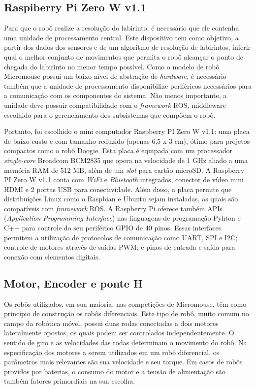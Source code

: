 \subsection{Raspiberry Pi Zero W v1.1}
\label{ssec:raspiberry_pi_zero}
Para que o robô realize a resolução do labirinto, é necessário que ele contenha uma unidade de processamento central. Este dispositivo tem como objetivo, a partir dos dados dos sensores e de um algoritmo de resolução de labirintos, inferir qual o melhor conjunto de movimentos que permita o robô alcançar o ponto de chegada do labirinto no menor tempo possível. Como o modelo de robô Micromouse possui um baixo nível de abstração de \textit{hardware}, é necessário também que a unidade de processamento disponibilize periféricos necessários para a comunicação com os componentes do sistema. Não menos importante, a unidade deve possuir compatibilidade com o \textit{framework} ROS, middleware escolhido para o gerenciamento dos subsistemas que compõem o robô.

Portanto, foi escolhido o mini computador Raspberry PI Zero W v1.1: uma placa de baixo custo e com tamanho reduzido (apenas 6,5 x 3 cm), ótimo para projetos compactos como o robô Doogie. Esta placa é equipada com um processador \textit{single-core} Broadcom BCM2835 que opera na velocidade de 1 GHz aliado a uma memória RAM de 512 MB, além de um \textit{slot} para cartão microSD. A Raspberry PI Zero W v1.1 conta com \textit{WiFi} e \textit{Bluetooth} integrados, conector de vídeo mini HDMI e 2 portas USB para conectividade. Além disso, a placa permite que distribuições Linux como o Raspbian e Ubuntu sejam instaladas, as quais são compatíveis com \textit{framework} ROS. A Raspberry Pi oferece também APIs (\textit{Application Programming Interface}) nas linguagens de programação Pyhton e C++ para controle do seu periférico GPIO de 40 pinos. Essas interfaces permitem a utilização de protocolos de comunicação como UART, SPI e I2C; controle de motores através de saídas PWM; e pinos de entrada e saída para conexão com elementos digitais.

\subsection{Motor, Encoder e ponte H}
\label{ssec:motor_encoder_ponte-h}
Os robôs utilizados, em sua maioria, nas competições de Micromouse, têm como princípio de construção os robôs diferenciais. Este tipo de robô, muito comum no campo da robótica móvel, possui duas rodas conectadas a dois motores lateralmente opostos, os quais podem ser controlados independentemente. O sentido de giro e as velocidades das rodas determinam  o movimento do robô. Na especificação dos motores a serem utilizados em um robô diferencial, os parâmetros mais relevantes são sua velocidade e seu torque. Em casos de robôs providos por baterias, o consumo do motor e a tensão de alimentação são também fatores primordiais na sua escolha.

